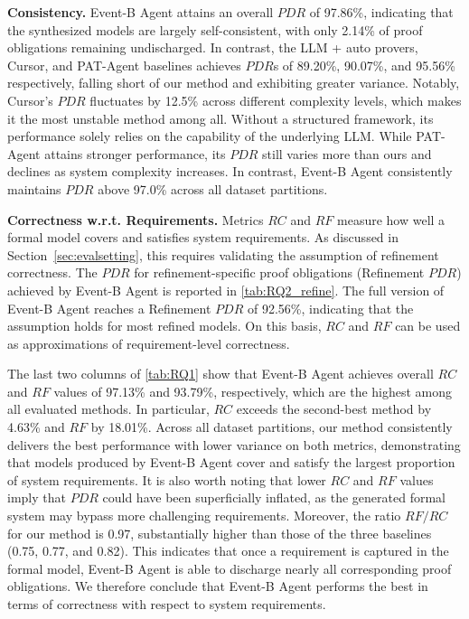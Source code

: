 \noindent
\textbf{Consistency.}
Event-B Agent attains an overall $PDR$ of 97.86\%, indicating that the synthesized models are largely self-consistent, with only 2.14\% of proof obligations remaining undischarged. 
In contrast, the LLM + auto provers, Cursor, and PAT-Agent baselines achieves $PDR$s of 89.20\%, 90.07\%, and 95.56\% respectively, falling short of our method and exhibiting greater variance. 
Notably, Cursor’s $PDR$ fluctuates by 12.5\% across different complexity levels, which makes it the most unstable method among all.
Without a structured framework, its performance solely relies on the capability of the underlying LLM.
While PAT-Agent attains stronger performance, its $PDR$ still varies more than ours and declines as system complexity increases. 
In contrast, Event-B Agent consistently maintains $PDR$ above 97.0\% across all dataset partitions.

\noindent
\textbf{Correctness w.r.t. Requirements.}
Metrics $RC$ and $RF$ measure how well a formal model covers and satisfies system requirements. 
As discussed in Section~\ref{sec:evalsetting}, this requires validating the assumption of refinement correctness. 
The $PDR$ for refinement-specific proof obligations (Refinement $PDR$) achieved by Event-B Agent is reported in \autoref{tab:RQ2_refine}. 
The full version of Event-B Agent reaches a Refinement $PDR$ of 92.56\%, indicating that the assumption holds for most refined models. 
On this basis, $RC$ and $RF$ can be used as approximations of requirement-level correctness.  

The last two columns of \autoref{tab:RQ1} show that Event-B Agent achieves overall $RC$ and $RF$ values of 97.13\% and 93.79\%, respectively, which are the highest among all evaluated methods. 
In particular, $RC$ exceeds the second-best method by 4.63\% and $RF$ by 18.01\%.
Across all dataset partitions, our method consistently delivers the best performance with lower variance on both metrics, demonstrating that models produced by Event-B Agent cover and satisfy the largest proportion of system requirements. 
It is also worth noting that lower $RC$ and $RF$ values imply that $PDR$ could have been superficially inflated, as the generated formal system may bypass more challenging requirements.
Moreover, the ratio $RF/RC$ for our method is 0.97, substantially higher than those of the three baselines (0.75, 0.77, and 0.82). 
This indicates that once a requirement is captured in the formal model, Event-B Agent is able to discharge nearly all corresponding proof obligations. 
We therefore conclude that Event-B Agent performs the best in terms of correctness with respect to system requirements.




